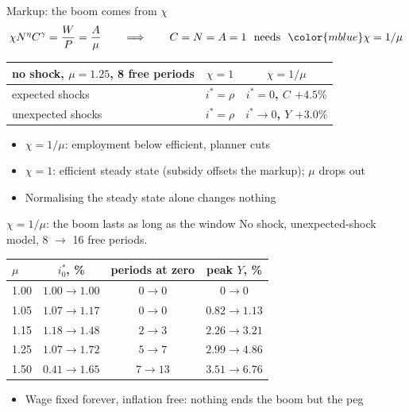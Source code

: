 \documentclass[aspectratio=169,11pt]{beamer}
\newcommand{\hl}[1]{{\color{mblue}\textbf{#1}}}
\newcommand{\ho}[1]{{\color{morange}\textbf{#1}}}
\begin{document}
\begin{frame}{Markup: the boom comes from $\chi$}
  \[
    \chi N^{\eta}C^{\gamma}=\frac{W}{P}=\frac{A}{\mu}
    \qquad\Longrightarrow\qquad
    C=N=A=1\ \text{ needs }\ \hl{$\chi=1/\mu$}
  \]
  \centering
  \begin{tabular}{lcc}
    \toprule
    no shock, $\mu=1.25$, 8 free periods & $\chi=1$ & $\chi=1/\mu$\\
    \midrule
    expected shocks   & $i^*=\rho$ & \ho{$i^*=0$, $C$ $+4.5\%$}\\
    unexpected shocks & $i^*=\rho$ & \ho{$i^*\to0$, $Y$ $+3.0\%$}\\
    \bottomrule
  \end{tabular}

  \bigskip
  \raggedright
  \begin{itemize}
    \item $\chi=1/\mu$: employment below efficient, planner cuts
    \item $\chi=1$: efficient steady state (subsidy offsets the markup); $\mu$ drops out
    \item Normalising the steady state alone changes nothing
  \end{itemize}
\end{frame}

\begin{frame}{$\chi=1/\mu$: the boom lasts as long as the window}
  No shock, unexpected-shock model, 8 $\to$ 16 free periods.

  \medskip
  \centering
  \begin{tabular}{lccc}
    \toprule
    $\mu$ & $i^*_0$, \% & periods at zero & peak $Y$, \%\\
    \midrule
    1.00 & $1.00\to1.00$ & $0\to0$ & $0\to0$\\
    1.05 & $1.07\to1.17$ & $0\to0$ & $0.82\to1.13$\\
    1.15 & $1.18\to1.48$ & $2\to3$ & $2.26\to3.21$\\
    1.25 & $1.07\to1.72$ & $5\to7$ & $2.99\to4.86$\\
    1.50 & $0.41\to1.65$ & $7\to13$ & $3.51\to6.76$\\
    \bottomrule
  \end{tabular}

  \bigskip
  \raggedright
  \begin{itemize}
    \item Wage fixed forever, inflation free: nothing ends the boom but the peg
  \end{itemize}
\end{frame}
\end{document}
